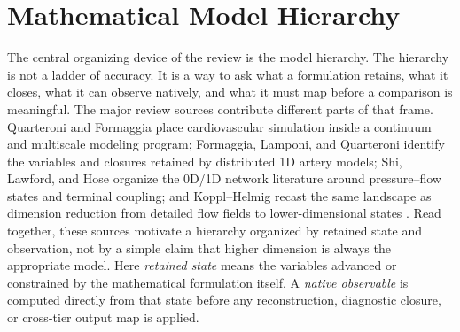 \section{Mathematical Model Hierarchy}
\label{sec:model-hierarchy}

The central organizing device of the review is the model hierarchy. The
hierarchy is not a ladder of accuracy. It is a way to ask what a formulation
retains, what it closes, what it can observe natively, and what it must map
before a comparison is meaningful. The major review sources contribute
different parts of that frame. Quarteroni and Formaggia place cardiovascular
simulation inside a continuum and multiscale modeling program; Formaggia,
Lamponi, and Quarteroni identify the variables and closures retained by
distributed 1D artery models; Shi, Lawford, and Hose organize the 0D/1D network
literature around pressure--flow states and terminal coupling; and
Koppl--Helmig recast the same landscape as dimension reduction from detailed
flow fields to lower-dimensional states
\cite{QuarteroniFormaggia2004CardiovascularModeling,FormaggiaEtAl2003OneDimensionalBloodFlow,ShiEtAl2011BloodFlowModelReview,KopplHelmig2023DimensionReducedModeling}.
Read together, these sources motivate a hierarchy organized by retained state
and observation, not by a simple claim that higher dimension is always the
appropriate model.
Here \emph{retained state} means the variables advanced or constrained by the
mathematical formulation itself. A \emph{native observable} is computed
directly from that state before any reconstruction, diagnostic closure, or
cross-tier output map is applied.

